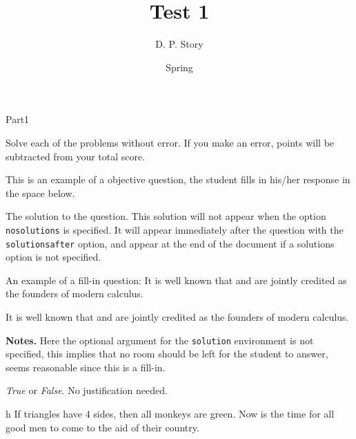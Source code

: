 \documentclass[12pt]{article}
\title[T1]{Test 1}
\author{D. P. Story}
\date{Spring \the\year}
\begin{document}
\maketitle


\begin{exam}[Part I.]{Part1}

\begin{instructions}[Part I.]
Solve each of the problems without error. If you make an error,
points will be subtracted from your total score. 
\end{instructions}

\begin{problem}[5]
This is an example of a objective question, the student fills in
his/her response in the space below.

\begin{solution}[.5in]
The solution to the question. This solution will not appear when
the option \texttt{nosolutions} is specified. It will appear
immediately after the question with the \texttt{solutionsafter}
option, and appear at the end of the document if a solutions
option is not specified.
\end{solution}
\end{problem}


\begin{problem}[5]
An example of a fill-in question:
It is well known that  and
 are jointly credited as the founders of
modern calculus.

\begin{solution}
It is well known that  and  are
jointly credited as the founders of modern calculus.

\medskip\noindent\textbf{Notes.} Here the optional argument for
the \texttt{solution} environment is not specified, this implies
that no room should be left for the student to answer, seems
reasonable since this is a fill-in.
\end{solution}
\end{problem}

\begin{problem*}[2ea]
\textit{True} or \textit{False}.  No justification needed.

\fillinWidth{}

\begin{parts}

    \item[h]  If triangles have $4$ sides, then all monkeys
    are green. Now is the time for all good men to come to the aid
    of their country.


\end{parts}
\end{problem*}
\end{exam}
\end{document}
